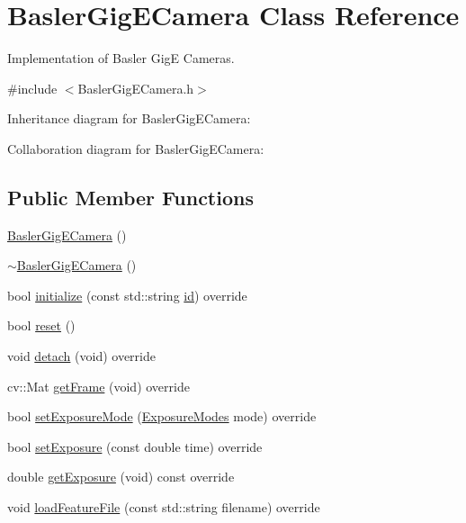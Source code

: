 \hypertarget{class_basler_gig_e_camera}{}\section{Basler\+Gig\+E\+Camera Class Reference}
\label{class_basler_gig_e_camera}


Implementation of Basler GigE Cameras.  




{\ttfamily \#include $<$Basler\+Gig\+E\+Camera.\+h$>$}



Inheritance diagram for Basler\+Gig\+E\+Camera\+:


Collaboration diagram for Basler\+Gig\+E\+Camera\+:
\subsection*{Public Member Functions}
\begin{DoxyCompactItemize}
\item 
\hyperlink{class_basler_gig_e_camera_a4e73954bf129084f8ad3aae41eb07ed5}{Basler\+Gig\+E\+Camera} ()
\item 
\hyperlink{class_basler_gig_e_camera_a0dbeed22c6adda8a9a9e7172a1a3f7ea}{$\sim$\+Basler\+Gig\+E\+Camera} ()
\item 
bool \hyperlink{class_basler_gig_e_camera_a1690e409075c423eec92a039781989df}{initialize} (const std\+::string \hyperlink{class_basler_gig_e_camera_a1f2a44906ddb75d4fa3b0d37bc6a131e}{id}) override
\item 
bool \hyperlink{class_basler_gig_e_camera_ad1f9154be71d1dba2e456fc404198774}{reset} ()
\item 
void \hyperlink{class_basler_gig_e_camera_a13a51a76116cccbd537725457d83254f}{detach} (void) override
\item 
cv\+::\+Mat \hyperlink{class_basler_gig_e_camera_a8e2789aa27a9b0a8075457223afa415e}{get\+Frame} (void) override
\item 
bool \hyperlink{class_basler_gig_e_camera_a228061fb068600be59b4e83c0e8a8e50}{set\+Exposure\+Mode} (\hyperlink{constants_8h_a6e920987695b1da6e2df4e41dc867e18}{Exposure\+Modes} mode) override
\item 
bool \hyperlink{class_basler_gig_e_camera_a99f9cd699aac5cb1025cb7086fbba7c0}{set\+Exposure} (const double time) override
\item 
double \hyperlink{class_basler_gig_e_camera_a5f7897cae5155958ecaa8b2b9196e4e6}{get\+Exposure} (void) const override
\item 
void \hyperlink{class_basler_gig_e_camera_aa7e8cde9ecc7b2375146f41a6e35840e}{load\+Feature\+File} (const std\+::string filename) override
\end{DoxyCompactItemize}
